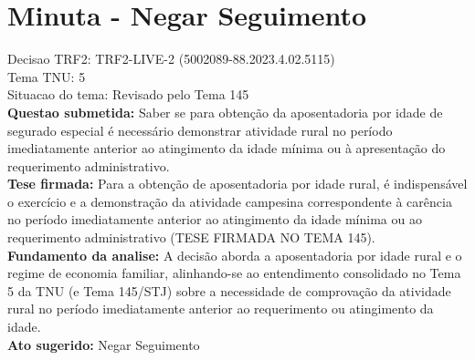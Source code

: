 \documentclass{article}
\begin{document}
\section*{Minuta - Negar Seguimento}
Decisao TRF2: TRF2-LIVE-2 (5002089-88.2023.4.02.5115)\\
Tema TNU: 5\\
Situacao do tema: Revisado pelo Tema 145\\
\textbf{Questao submetida:} Saber se para obtenção da aposentadoria por idade de segurado especial é necessário demonstrar atividade rural no período imediatamente anterior ao atingimento da idade mínima ou à apresentação do requerimento administrativo.\\
\textbf{Tese firmada:} Para a obtenção de aposentadoria por idade rural, é indispensável o exercício e a demonstração da atividade campesina correspondente à carência no período imediatamente anterior ao atingimento da idade mínima ou ao requerimento administrativo (TESE FIRMADA NO TEMA 145).\\
\textbf{Fundamento da analise:} A decisão aborda a aposentadoria por idade rural e o regime de economia familiar, alinhando-se ao entendimento consolidado no Tema 5 da TNU (e Tema 145/STJ) sobre a necessidade de comprovação da atividade rural no período imediatamente anterior ao requerimento ou atingimento da idade.\\
\textbf{Ato sugerido:} Negar Seguimento
\end{document}
